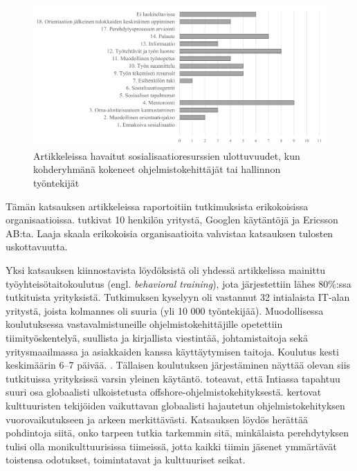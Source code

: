 \documentclass[utf8]{gradu3}
\begin{document}
\begin{figure}[h]
    \centering
    \includegraphics[width=\textwidth]{media/ulottuvuudet_kohderyhmat_kokeneet_tai_hallinto.png}
    \caption{Artikkeleissa havaitut sosialisaatioresurssien ulottuvuudet, kun kohderyhmänä kokeneet ohjelmistokehittäjät tai hallinnon työntekijät}
    \label{kuvio:ulottuvuudet_kohderyhmat_kokeneet_tai_hallinto}
\end{figure}

Tämän katsauksen artikkeleissa raportoitiin tutkimuksista erikokoisissa organisaatioissa. \textcite{viana-ym-2014} tutkivat 10 henkilön yritystä, \textcite{johnson-senges-2010} Googlen käytäntöjä ja \textcite{britto-ym-2020} Ericsson AB:ta. Laaja skaala erikokoisia organisaatioita vahvistaa katsauksen tulosten uskottavuutta.

Yksi katsauksen kiinnostavista löydöksistä oli yhdessä artikkelissa \parencite{kulkarni-ym-2010} mainittu työyhteisötaitokoulutus (engl. \textit{behavioral training}), jota järjestettiin lähes 80\%:ssa tutkituista yrityksistä. Tutkimuksen kyselyyn oli vastannut 32 intialaista IT-alan yritystä, joista kolmannes oli suuria (yli 10 000 työntekijää). Muodollisessa koulutuksessa vastavalmistuneille ohjelmistokehittäjille opetettiin tiimityöskentelyä, suullista ja kirjallista viestintää, johtamistaitoja sekä yritysmaailmassa ja asiakkaiden kanssa käyttäytymisen taitoja. Koulutus kesti keskimäärin 6--7 päivää. \parencite{kulkarni-ym-2010}. Tällaisen koulutuksen järjestäminen näyttää olevan siis tutkituissa yrityksissä varsin yleinen käytäntö. \textcite{kulkarni-ym-2010} toteavat, että Intiassa tapahtuu suuri osa globaalisti ulkoistetusta offshore-ohjelmistokehityksestä. \textcite{olson-olson-2003} kertovat kulttuuristen tekijöiden vaikuttavan globaalisti hajautetun ohjelmistokehityksen vuorovaikutukseen ja arkeen merkittävästi. Katsauksen löydös herättää pohdintoja siitä, onko tarpeen tutkia tarkemmin sitä, minkälaista perehdytyksen tulisi olla monikulttuurisissa tiimeissä, jotta kaikki tiimin jäsenet ymmärtävät toistensa odotukset, toimintatavat ja kulttuuriset seikat.
\end{document}
